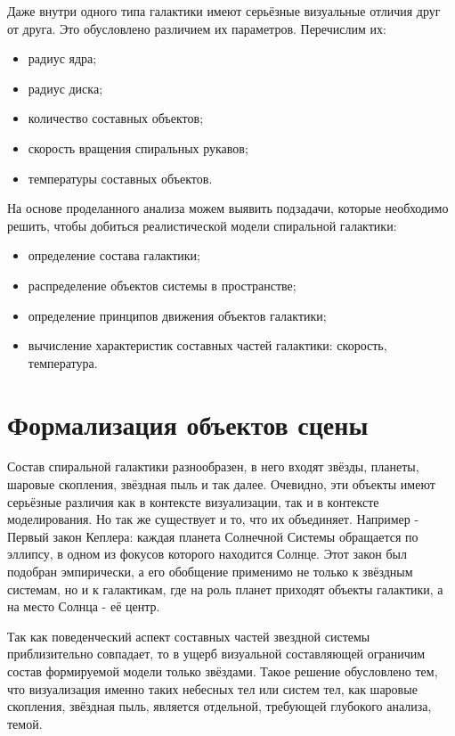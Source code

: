 Даже внутри одного типа галактики имеют серьёзные визуальные отличия друг от друга. Это обусловлено различием их параметров. Перечислим их:
\begin{itemize}
    \item радиус ядра;
    \item радиус диска;
    \item количество составных объектов;
    \item скорость вращения спиральных рукавов;
    \item температуры составных объектов.
\end{itemize}

На основе проделанного анализа можем выявить подзадачи, которые необходимо решить, чтобы добиться реалистической модели спиральной галактики:
\begin{itemize}
    \item определение состава галактики;
    \item распределение объектов системы в пространстве;
    \item определение принципов движения объектов галактики;
    \item вычисление характеристик составных частей галактики: скорость, температура.
\end{itemize}

\section{Формализация объектов сцены}

Состав спиральной галактики разнообразен, в него входят звёзды, планеты, шаровые скопления, звёздная пыль и так далее. Очевидно, эти объекты имеют серьёзные различия как в контексте визуализации, так и в контексте моделирования. Но так же существует и то, что их объединяет. Например - Первый закон Кеплера: каждая планета Солнечной Системы обращается по эллипсу, в одном из фокусов которого находится Солнце. Этот закон был подобран эмпирически, а его обобщение применимо не только к звёздным системам, но и к галактикам, где на роль планет приходят объекты галактики, а на место Солнца - её центр\cite{erp}.

Так как поведенческий аспект составных частей звездной системы приблизительно совпадает, то в ущерб визуальной составляющей ограничим состав формируемой модели только звёздами. Такое решение обусловлено тем, что визуализация именно таких небесных тел или систем тел, как шаровые скопления, звёздная пыль, является отдельной, требующей глубокого анализа, темой.

